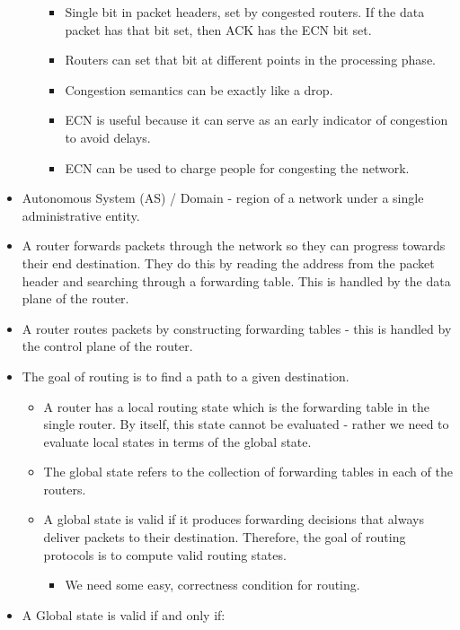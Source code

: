 \begin{itemize}
\begin{itemize}
    \begin{itemize}
    \tightlist
    \item
      Single bit in packet headers, set by congested routers. If the
      data packet has that bit set, then ACK has the ECN bit set.
    \item
      Routers can set that bit at different points in the processing
      phase.
    \item
      Congestion semantics can be exactly like a drop.
    \item
      ECN is useful because it can serve as an early indicator of
      congestion to avoid delays.
    \item
      ECN can be used to charge people for congesting the network.
    \end{itemize}
  \end{itemize}
\item
  Autonomous System (AS) / Domain - region of a network under a single
  administrative entity.
\item
  A router forwards packets through the network so they can progress
  towards their end destination. They do this by reading the address
  from the packet header and searching through a forwarding table. This
  is handled by the data plane of the router.
\item
  A router routes packets by constructing forwarding tables - this is
  handled by the control plane of the router.
\item
  The goal of routing is to find a path to a given destination.

  \begin{itemize}
  \tightlist
  \item
    A router has a local routing state which is the forwarding table in
    the single router. By itself, this state cannot be evaluated -
    rather we need to evaluate local states in terms of the global
    state.
  \item
    The global state refers to the collection of forwarding tables in
    each of the routers.
  \item
    A global state is valid if it produces forwarding decisions that
    always deliver packets to their destination. Therefore, the goal of
    routing protocols is to compute valid routing states.

    \begin{itemize}
    \tightlist
    \item
      We need some easy, correctness condition for routing.
    \end{itemize}
  \end{itemize}
\item
  A Global state is valid if and only if:


\end{itemize}
